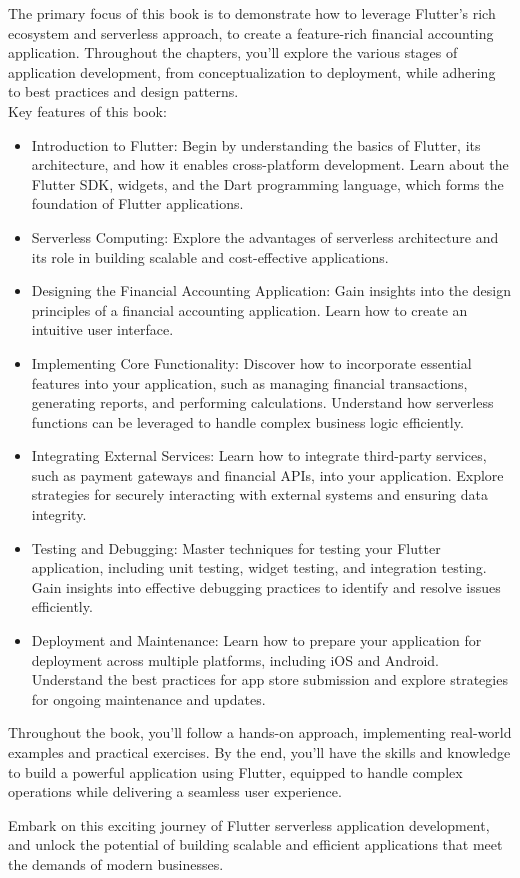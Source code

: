 The primary focus of this book is to demonstrate how to leverage Flutter's rich ecosystem and serverless approach, 
to create a feature-rich financial accounting application. Throughout the chapters, you'll explore the various 
stages of application development, from conceptualization to deployment, while adhering to best practices and 
design patterns.
\\
\noindent Key features of this book:
\begin{itemize}
    \item Introduction to Flutter: Begin by understanding the basics of Flutter, its architecture, and how it 
    enables cross-platform development. Learn about the Flutter SDK, widgets, and the Dart programming language, 
    which forms the foundation of Flutter applications.

    \item Serverless Computing: Explore the advantages of serverless architecture and its role in building 
    scalable and cost-effective applications.

    \item Designing the Financial Accounting Application: Gain insights into the design principles of a financial 
    accounting application. Learn how to create an intuitive user interface.

    \item Implementing Core Functionality: Discover how to incorporate essential features into your application, 
    such as managing financial transactions, generating reports, and performing calculations. Understand how 
    serverless functions can be leveraged to handle complex business logic efficiently.

    \item Integrating External Services: Learn how to integrate third-party services, such as payment gateways 
    and financial APIs, into your application. Explore strategies for securely interacting with external 
    systems and ensuring data integrity.

    \item Testing and Debugging: Master techniques for testing your Flutter application, including unit testing, 
    widget testing, and integration testing. Gain insights into effective debugging practices to identify and 
    resolve issues efficiently.

    \item Deployment and Maintenance: Learn how to prepare your application for deployment across multiple 
    platforms, including iOS and Android. Understand the best practices for app store submission and explore 
    strategies for ongoing maintenance and updates.
\end{itemize}

Throughout the book, you'll follow a hands-on approach, implementing real-world examples and practical exercises. 
By the end, you'll have the skills and knowledge to build a powerful application using Flutter, equipped to 
handle complex operations while delivering a seamless user experience.

Embark on this exciting journey of Flutter serverless application development, and unlock the potential of 
building scalable and efficient applications that meet the demands of modern businesses.
